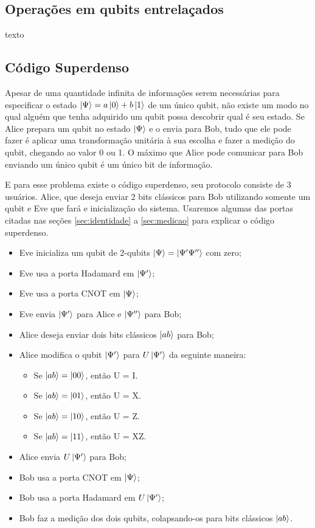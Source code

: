 \documentclass[a4paper, 12pt, oneside]{book}
\begin{document}
\subsection{Operações em qubits entrelaçados}

texto

\subsection{Código Superdenso} \label{sec:superdenso}

Apesar de uma quantidade infinita de informações serem necessárias para especificar o estado $\ket{\Psi}=a\ket{0}+b\ket{1}$ de um único qubit, não existe um modo no qual alguém que tenha adquirido um qubit possa descobrir qual é seu estado. Se Alice prepara um qubit no estado $\ket{\Psi}$ e o envia para Bob, tudo que ele pode fazer é aplicar uma transformação unitária à sua escolha e fazer a medição do qubit, chegando ao valor 0 ou 1. O máximo que Alice pode comunicar para Bob enviando um único qubit é um único bit de informação.

E para esse problema existe o código superdenso, seu protocolo consiste de 3 usuários. Alice, que deseja enviar 2 bits clássicos para Bob utilizando somente um qubit e Eve que fará e inicialização do sistema. Usaremos algumas das portas citadas nas seções \ref{sec:identidade} a \ref{sec:medicao} para explicar o código superdenso.

\begin{itemize}
\item Eve inicializa um qubit de 2-qubits $\ket{\Psi} = \ket{\Psi'\Psi''}$ com zero;
\item Eve usa a porta Hadamard em $\ket{\Psi'}$;
\item Eve usa a porta CNOT em $\ket{\Psi}$;
\item Eve envia $\ket{\Psi'}$ para Alice e $\ket{\Psi''}$ para Bob;
\item Alice deseja enviar dois bits clássicos $\ket{ab}$ para Bob;
\item Alice modifica o qubit $\ket{\Psi'}$ para $U\ket{\Psi'}$ da seguinte maneira:
	\begin{itemize}
	\item Se $\ket{ab}=\ket{00}$, então U = I.
	\item Se $\ket{ab}=\ket{01}$, então U = X.
	\item Se $\ket{ab}=\ket{10}$, então U = Z.
	\item Se $\ket{ab}=\ket{11}$, então U = XZ.
	\end{itemize}
\item Alice envia $U\ket{\Psi'}$ para Bob;
\item Bob usa a porta CNOT em $\ket{\Psi}$;
\item Bob usa a porta Hadamard em $U\ket{\Psi'}$;
\item Bob faz a medição dos dois qubits, colapsando-os para bits clássicos $\ket{ab}$.
\end{itemize}
\end{document}
